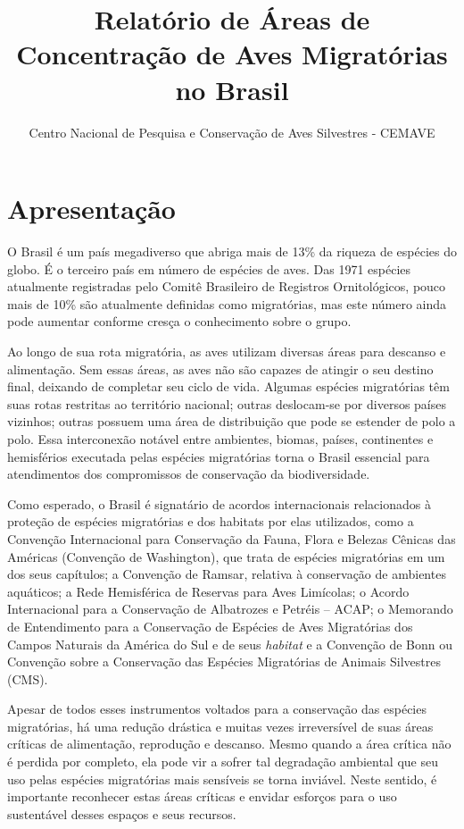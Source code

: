 \documentclass[
  oneside]{scrbook}
\title{Relatório de Áreas de Concentração de Aves Migratórias no Brasil}
\author{Centro Nacional de Pesquisa e Conservação de Aves Silvestres - CEMAVE}
\date{}
\begin{document}

\maketitle

{
\setcounter{tocdepth}{1}
\tableofcontents
}
\pagestyle{plain}

\hypertarget{apresentacao}{%
\chapter*{Apresentação}\label{apresentacao}}

O Brasil é um país megadiverso que abriga mais de 13\% da riqueza de espécies do globo. É o terceiro país em número de espécies de aves. Das 1971 espécies atualmente registradas pelo Comitê Brasileiro de Registros Ornitológicos, pouco mais de 10\% são atualmente definidas como migratórias, mas este número ainda pode aumentar conforme cresça o conhecimento sobre o grupo.

Ao longo de sua rota migratória, as aves utilizam diversas áreas para descanso e alimentação. Sem essas áreas, as aves não são capazes de atingir o seu destino final, deixando de completar seu ciclo de vida. Algumas espécies migratórias têm suas rotas restritas ao território nacional; outras deslocam-se por diversos países vizinhos; outras possuem uma área de distribuição que pode se estender de polo a polo. Essa interconexão notável entre ambientes, biomas, países, continentes e hemisférios executada pelas espécies migratórias torna o Brasil essencial para atendimentos dos compromissos de conservação da biodiversidade.

Como esperado, o Brasil é signatário de acordos internacionais relacionados à proteção de espécies migratórias e dos habitats por elas utilizados, como a Convenção Internacional para Conservação da Fauna, Flora e Belezas Cênicas das Américas (Convenção de Washington), que trata de espécies migratórias em um dos seus capítulos; a Convenção de Ramsar, relativa à conservação de ambientes aquáticos; a Rede Hemisférica de Reservas para Aves Limícolas; o Acordo Internacional para a Conservação de Albatrozes e Petréis -- ACAP; o Memorando de Entendimento para a Conservação de Espécies de Aves Migratórias dos Campos Naturais da América do Sul e de seus \emph{habitat} e a Convenção de Bonn ou Convenção sobre a Conservação das Espécies Migratórias de Animais Silvestres (CMS).

Apesar de todos esses instrumentos voltados para a conservação das espécies migratórias, há uma redução drástica e muitas vezes irreversível de suas áreas críticas de alimentação, reprodução e descanso. Mesmo quando a área crítica não é perdida por completo, ela pode vir a sofrer tal degradação ambiental que seu uso pelas espécies migratórias mais sensíveis se torna inviável. Neste sentido, é importante reconhecer estas áreas críticas e envidar esforços para o uso sustentável desses espaços e seus recursos.
\end{document}

